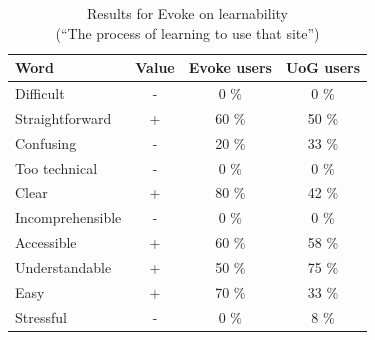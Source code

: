 \begin{table}[htbp]
\begin{minipage}{.7\textwidth}
    \begin{tabular}{p{1in}ccc}
    \toprule
        \textbf{Word} & \textbf{Value} & \textbf{Evoke users} & \textbf{UoG users} \\ 
    \midrule
        Difficult & - & 0 \% & 0 \% \\
        Straightforward & + & 60 \% & 50 \% \\
        Confusing & - & 20 \% & 33 \% \\
        Too technical & - & 0 \% & 0 \% \\
        Clear & + & 80 \% & 42 \% \\
        Incomprehensible & - & 0 \% & 0 \% \\
        Accessible & + & 60 \% & 58 \% \\
        Understandable & + & 50 \% & 75 \% \\
        Easy & + & 70 \% & 33 \% \\
        Stressful & - & 0 \% & 8 \% \\
    \midrule
    \end{tabular}
    \caption[]{\label{table:Stolk2021x:eval:Evoke-learnability}Results for Evoke on learnability\\(``The process of learning to use that site'')}
\end{minipage}
\begin{minipage}{.29\textwidth}
  
\end{minipage}
\end{table}


